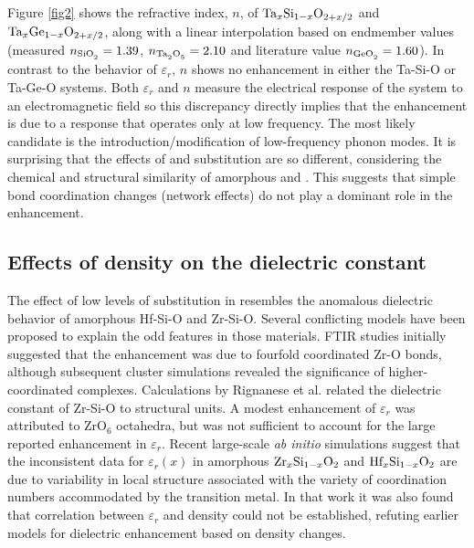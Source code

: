 \documentclass[aip,jap,numerical,citeautoscript,preprint]{revtex4-1}
\begin{document}
Figure \ref{fig2} shows the refractive index, $n$, of $\textnormal{Ta}_{x}\textnormal{Si}_{1-x}\textnormal{O}_{2+x/2}$ and $\textnormal{Ta}_{x}\textnormal{Ge}_{1-x}\textnormal{O}_{2+x/2}$, along with a linear interpolation based on endmember values (measured $n_{\ce{SiO2}}= 1.39$, $n_{\ce{Ta2O5}}= 2.10$ and literature value $n_{\ce{GeO2}}= 1.60$\cite{Caperaa1989}). 
In contrast to the behavior of $\varepsilon_r$, $n$ shows no enhancement in either the Ta-Si-O or Ta-Ge-O systems. 
Both $\varepsilon_r$ and $n$ measure the electrical response of the system to an electromagnetic field so this discrepancy directly implies that the enhancement is due to a response that operates only at low frequency. The most likely candidate is the introduction/modification of low-frequency phonon modes. It is surprising that the effects of  and  substitution are so different, considering the chemical and structural similarity of amorphous  and . This suggests that simple bond coordination changes (network effects) do not play a dominant role in the enhancement. 

\subsection{Effects of density on the dielectric constant}

The effect of low levels of  substitution in  resembles the anomalous dielectric behavior of amorphous Hf-Si-O and Zr-Si-O.\cite{Wilk2000a} Several conflicting models have been proposed to explain the odd features in those materials. FTIR studies initially suggested that the enhancement was due to fourfold coordinated Zr-O bonds,\cite{Lucovsky2000} although subsequent cluster simulations revealed the significance of higher-coordinated complexes.\cite{Kurtz2001} Calculations by Rignanese et al. related the dielectric constant of Zr-Si-O to structural units. \cite{Rignanese2002} A modest enhancement of $\varepsilon_{r}$ was attributed to ZrO$_{6}$ octahedra, but was not sufficient to account for the large reported enhancement in $\varepsilon_{r}$. Recent large-scale \textit{ab initio} simulations suggest that the inconsistent data for $\varepsilon_{r} (x)$ in amorphous $\textnormal{Zr}_{x}\textnormal{Si}_{1-x}\textnormal{O}_{2}$ and $\textnormal{Hf}_{x}\textnormal{Si}_{1-x}\textnormal{O}_{2}$ are due to variability in local structure associated with the variety of coordination numbers accommodated by the transition metal.\cite{Pignedoli2007} In that work it was also found that correlation between $\varepsilon_{r}$ and density could not be established, refuting earlier models for dielectric enhancement based on density changes.\cite{Kurtz2001,Devine2001}
\end{document}
